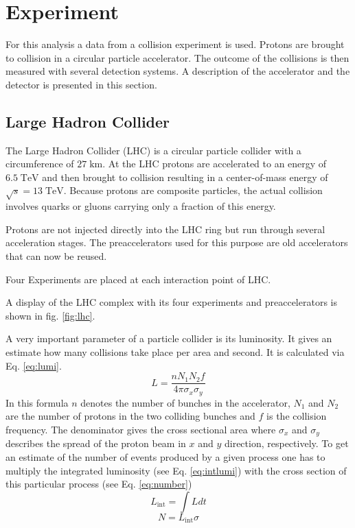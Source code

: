 \chapter{Experiment}
	For this analysis a data from a collision experiment is used. Protons are brought to collision in a circular particle accelerator. The outcome of the collisions is then measured with several detection systems. A description of the accelerator and the detector is presented in this section.
\section{Large Hadron Collider}
	The Large Hadron Collider (LHC) is a circular particle collider with a circumference of $27\;\text{km}$. At the LHC protons are accelerated to an energy of $6.5\;\text{TeV}$ and then brought to collision resulting in a center-of-mass energy of $\sqrt{s}=13\;\text{TeV}$. Because protons are composite particles, the actual collision involves quarks or gluons carrying only a fraction of this energy. 
	
	Protons are not injected directly into the LHC ring but run through several acceleration stages. The preaccelerators used for this purpose are old accelerators that can now be reused.
	
	Four Experiments are placed at each interaction point of LHC.
	
	A display of the LHC complex with its four experiments and preaccelerators is shown in fig. \ref{fig:lhc}.
	
	A very important parameter of a particle collider is its luminosity. It gives an estimate how many collisions take place per area and second. It is calculated via Eq. \ref{eq:lumi}. 
	\begin{equation}
	L = \frac{n N_1 N_2 f}{4 \pi \sigma_x \sigma_y}
	\label{eq:lumi}
	\end{equation} 
	In this formula $n$ denotes the number of bunches in the accelerator, $N_1$ and $N_2$ are the number of protons in the two colliding bunches and $f$ is the collision frequency. The denominator gives the cross sectional area where $\sigma_x$ and $\sigma_y$ describes the spread of the proton beam in $x$ and $y$ direction, respectively. To get an estimate of the number of events produced by a given process one has to multiply the integrated luminosity (see Eq. \ref{eq:intlumi}) with the cross section of this particular process (see Eq. \ref{eq:number})
	\begin{equation}
	L_\text{int} = \int L dt
	\label{eq:intlumi}
	\end{equation} 
	\begin{equation}
	N = L_\text{int} \sigma
	\label{eq:number}
	\end{equation} 
	
